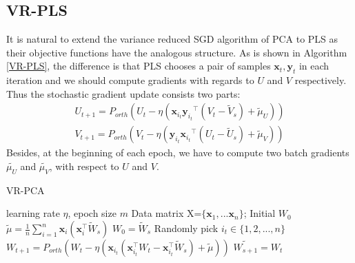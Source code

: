 \documentclass[conference]{IEEEtran}
\begin{document}
 \subsection{VR-PLS}
 It is natural to extend the variance reduced SGD algorithm of PCA to PLS as their objective functions have the analogous structure. As is shown in Algorithm \ref{VR-PLS}, the difference is that PLS chooses a pair of samples $\mathbf{x}_t, \mathbf{y}_t$ in each iteration and we should compute gradients with regards to $U$ and $V$ respectively. Thus the stochastic gradient update consists two parts: 
 \begin{equation}
 \begin{split}
 U_{t+1} = P_{orth}(U_{t} - \eta(\mathbf{x}_{i_t} {\mathbf{y}_{i_t}}^{\top}(V_t - \tilde{V}_s) + \tilde{\mu}_U))\\
 V_{t+1} = P_{orth}(V_{t} - \eta(\mathbf{y}_{i_t} {\mathbf{x}_{i_t}}^{\top}(U_t - \tilde{U}_s) + \tilde{\mu}_V))
 \end{split}
 \end{equation}
 Besides, at the beginning of each epoch, we have to compute two batch gradients $\tilde{\mu_U}$ and $\tilde{\mu_V}$, with respect to $U$ and $V$. 
 
  \begin{algorithm}[t]
 	\caption{\textsc{VR-PCA}}
 	\label{VR-PCA}
	\begin{algorithmic}[1]
	\Require learning rate $\eta$, epoch size $m$
	\Input Data matrix X=$\{\mathbf{x}_1, ... \mathbf{x}_n\}$; Initial $W_0$
		\State $\tilde{\mu} = \frac{1}{n}\sum\limits_{i=1}^{n}\mathbf{x}_{i}(\mathbf{x}_{i}^{\top}\tilde{W}_{s})$
		\State $W_0 = \tilde{W}_s$
			\State Randomly pick $i_t\in\{1, 2, ..., n\}$
			\State $W_{t+1} = P_{orth}(W_{t} - \eta(\mathbf{x}_{i_t}(\mathbf{x}_{i_t}^{\top}W_{t}-\mathbf{x}_{i_t}^{\top}\tilde{W}_{s})+\tilde{\mu}))$
		\EndFor
		\State $\tilde{W_{s+1}} = W_{t}$
			
	\EndFor
	\end{algorithmic}
\end{algorithm}
 
 
 
\end{document}
